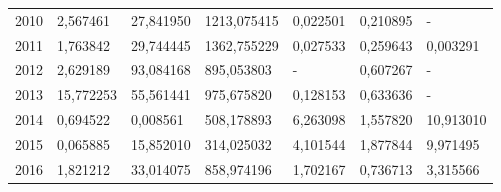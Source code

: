 \begin{table}
\begin{tabular}{p{1cm}p{2cm}p{2cm}p{2cm}p{2cm}p{2cm}p{2cm}}
 2010 &                 2,567461 &                        27,841950 &                                  1213,075415 &            0,022501 &                 0,210895 &          - \\
 2011 &                 1,763842 &                        29,744445 &                                  1362,755229 &            0,027533 &                 0,259643 &   0,003291 \\
 2012 &                 2,629189 &                        93,084168 &                                   895,053803 &                   - &                 0,607267 &          - \\
 2013 &                15,772253 &                        55,561441 &                                   975,675820 &            0,128153 &                 0,633636 &          - \\
 2014 &                 0,694522 &                         0,008561 &                                   508,178893 &            6,263098 &                 1,557820 &  10,913010 \\
 2015 &                 0,065885 &                        15,852010 &                                   314,025032 &            4,101544 &                 1,877844 &   9,971495 \\
 2016 &                 1,821212 &                        33,014075 &                                   858,974196 &            1,702167 &                 0,736713 &   3,315566 \\
\bottomrule
\end{tabular}
\end{table}
